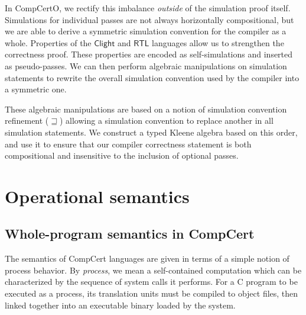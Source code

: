\documentclass[acmsmall,screen,review,anonymous]{acmart}
\newcommand{\kw}[1]{\ensuremath{ \mathsf{#1} }}
\newcommand{\scref}{\sqsupseteq}
\begin{document}
In CompCertO,
we rectify this imbalance \emph{outside}
of the simulation proof itself.
Simulations for individual passes are not always
horizontally compositional,
but we are able to derive a symmetric simulation convention
for the compiler as a whole.
Properties of the $\kw{Clight}$ and $\kw{RTL}$ languages
allow us to strengthen the correctness proof.
These properties are encoded as self-simulations
and inserted as pseudo-passes.
We can then perform algebraic manipulations
on simulation statements
to rewrite the overall simulation convention
used by the compiler into a symmetric one.

These algebraic manipulations are
based on a notion of
simulation convention refinement ($\scref$)
allowing a simulation convention
to replace another in all simulation statements.
We construct a typed Kleene algebra \cite{tka}
based on this order,
and use it to ensure that
our compiler correctness statement
is both compositional
and insensitive to the inclusion of optional passes.



\section{Operational semantics} \label{sec:sem} %


\subsection{Whole-program semantics in CompCert} \label{sec:sem:closed} %

The semantics of CompCert languages
are given in terms of a simple notion of process behavior.
By \emph{process}, we mean a self-contained computation
which can be characterized by
the sequence of system calls it performs.
For a C program to be executed as a process,
its translation units must be compiled to object files,
then linked together
into an executable binary
loaded by the system.
\end{document}
